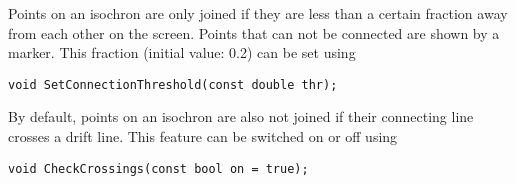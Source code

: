 Points on an isochron are only joined if they are less than a 
certain fraction away from each other on the screen. 
Points that can not be connected are shown by a marker. 
This fraction (initial value: 0.2) can be set using
\begin{lstlisting}
void SetConnectionThreshold(const double thr);
\end{lstlisting}
By default, points on an isochron are also not joined if their connecting 
line crosses a drift line.
This feature can be switched on or off using
\begin{lstlisting}
void CheckCrossings(const bool on = true);
\end{lstlisting}



